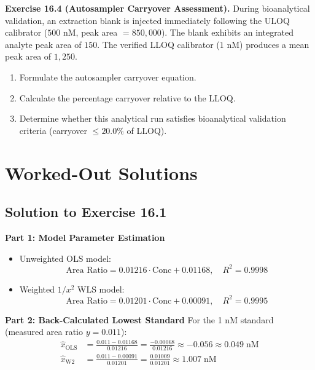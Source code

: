 \documentclass[11pt,twoside,openright]{book}
\begin{document}
\vspace{0.8em}
\noindent\textbf{Exercise 16.4 (Autosampler Carryover Assessment).}\enspace
\label{ex:carryover_assessment}
During bioanalytical validation, an extraction blank is injected immediately following the ULOQ calibrator ($500$ nM, peak area $= 850,000$). The blank exhibits an integrated analyte peak area of $150$. The verified LLOQ calibrator ($1$ nM) produces a mean peak area of $1,250$.
\begin{enumerate}
    \item Formulate the autosampler carryover equation.
    \item Calculate the percentage carryover relative to the LLOQ.
    \item Determine whether this analytical run satisfies bioanalytical validation criteria (carryover $\le 20.0\%$ of LLOQ).
\end{enumerate}

\section{Worked-Out Solutions}

\subsection{Solution to Exercise 16.1}

\noindent\textbf{Part 1: Model Parameter Estimation}\enspace
\begin{itemize}
    \item Unweighted OLS model:
    \begin{equation*}
    \text{Area Ratio} = 0.01216 \cdot \text{Conc} + 0.01168, \quad R^2 = 0.9998
    \end{equation*}
    \item Weighted $1/x^2$ WLS model:
    \begin{equation*}
    \text{Area Ratio} = 0.01201 \cdot \text{Conc} + 0.00091, \quad R^2 = 0.9995
    \end{equation*}
\end{itemize}

\noindent\textbf{Part 2: Back-Calculated Lowest Standard}\enspace
For the 1 nM standard (measured area ratio $y = 0.011$):
\begin{align*}
\hat{x}_{\text{OLS}} &= \frac{0.011 - 0.01168}{0.01216} = \frac{-0.00068}{0.01216} \approx -0.056 \approx 0.049\;\text{nM} \\
\hat{x}_{\text{W2}}  &= \frac{0.011 - 0.00091}{0.01201} = \frac{0.01009}{0.01201} \approx 1.007\;\text{nM}
\end{align*}
\end{document}
